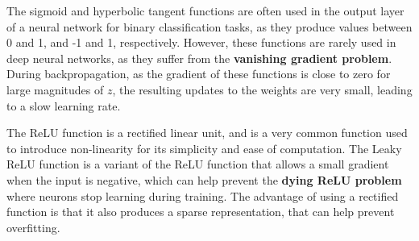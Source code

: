 \documentclass{article}
\begin{document}
The sigmoid and hyperbolic tangent functions are often used in the output
layer of a neural network for binary classification tasks, as they
produce values between 0 and 1, and -1 and 1, respectively. However,
these functions are rarely used in deep neural networks, as they suffer
from the \textbf{vanishing gradient problem}. During backpropagation, as
the gradient of these functions is close to zero for large magnitudes of
\(z\), the resulting updates to the weights are very small, leading to a
slow learning rate.

The ReLU function is a rectified linear unit, and is a very common
function used to introduce non-linearity for its simplicity and ease of
computation. The Leaky ReLU function is a variant of the ReLU function
that allows a small gradient when the input is negative, which can help
prevent the \textbf{dying ReLU problem} where neurons stop learning
during training. The advantage of using a rectified function is that it
also produces a sparse representation, that can help prevent
overfitting.
\end{document}
